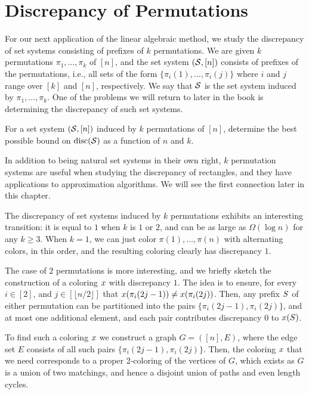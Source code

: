 \section{Discrepancy of Permutations}

For our next application of the linear algebraic method, we study the
discrepancy of set systems consisting of prefixes of \(k\)
permutations. We are given \(k\) permutations \(\pi_1, \ldots, \pi_k\)
of \([n]\), and the set system \((\mathcal{S}, [n])\) consists of prefixes of
the permutations, i.e., all sets of
the form \(\{\pi_i(1), \ldots, \pi_i(j)\}\) where \(i\) and \(j\)
range over \([k]\) and \([n]\), respectively. We say that \(\mathcal{S}\)
is the set system induced by \(\pi_1, \ldots, \pi_k\). One of the
problems we will return to later in the book is determining the
discrepancy of such set systems.
\begin{problem}
  For a set system \((\mathcal{S}, [n])\) induced by \(k\) permutations of
  \([n]\), determine the best possible bound on \(\operatorname{disc}(\mathcal{S})\) as a
  function of \(n\) and \(k\).
\end{problem}
In addition to being
natural set systems in their own right, \(k\) permutation systems are
useful when studying the discrepancy of rectangles, and they have 
applications to approximation algorithms. We will see the first connection later in this chapter. 

The discrepancy of set systems induced by \(k\) permutations exhibits
an interesting transition: it is equal to \(1\) when \(k\) is \(1\) or
\(2\), and can be as large as \(\Omega(\log n)\) for any \(k\ge
3\). When \(k = 1\), we can just color \(\pi(1), \ldots,
\pi(n)\) with alternating colors, in this order, and the resulting
coloring clearly has discrepancy \(1\). 

\medskip 
The case of \(2\) permutations
is more interesting, and we briefly sketch the construction of a
coloring \(x\) with discrepancy \(1\). The idea is to ensure, for
every \(i \in [2]\), and \(j \in [\lfloor n/2\rfloor]\) that
\(x(\pi_i(2j - 1)) \neq x(\pi_i(2j))\). Then, any prefix
\(S\) of either permutation can be partitioned into the pairs \(\{\pi_i(2j-1),
\pi_i(2j)\}\), and at most one additional element, and each pair
contributes discrepancy \(0\) to \(x(S)\).

To find such a coloring \(x\) we construct a graph \(G = ([n], E)\), where the
edge set \(E\) consists of all such pairs \(\{\pi_i(2j-1),
\pi_i(2j)\}\).
Then, the coloring \(x\) that we
need corresponds to a proper 2-coloring of the vertices of \(G\),
which exists as \(G\) is a union of two
matchings, and hence a disjoint union of paths and even length
cycles.


